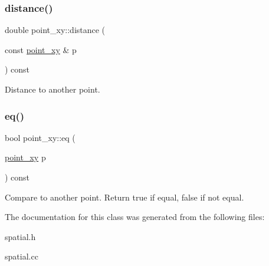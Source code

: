 \subsubsection{\texorpdfstring{distance()}{distance()}}
{\footnotesize\ttfamily double point\+\_\+xy\+::distance (\begin{DoxyParamCaption}\item[{const \mbox{\hyperlink{classpoint__xy}{point\+\_\+xy}} \&}]{p }\end{DoxyParamCaption}) const}

Distance to another point. \mbox{\label{classpoint__xy_a8d5a5b0b2b032db98336b854b6ec15e5}} 
\subsubsection{\texorpdfstring{eq()}{eq()}}
{\footnotesize\ttfamily bool point\+\_\+xy\+::eq (\begin{DoxyParamCaption}\item[{\mbox{\hyperlink{classpoint__xy}{point\+\_\+xy}}}]{p }\end{DoxyParamCaption}) const\hspace{0.3cm}{\ttfamily [inline]}}

Compare to another point. Return true if equal, false if not equal. 

The documentation for this class was generated from the following files\+:\begin{DoxyCompactItemize}
\item 
spatial.\+h\item 
spatial.\+cc\end{DoxyCompactItemize}
